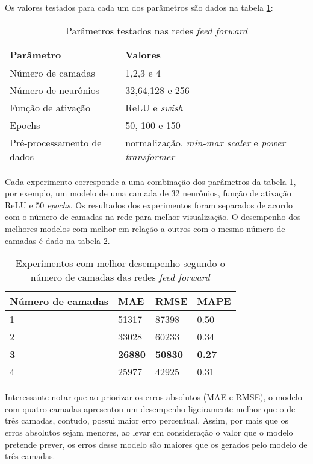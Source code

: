 Os valores testados para cada um dos parâmetros são dados na tabela \ref{tab:param-mlp}:

\begin{table}[H]
    \centering
    \begin{tabular}{ll}
        \toprule
        Parâmetro           & Valores   \\
        \midrule
        Número de camadas   & 1,2,3 e 4 \\
        Número de neurônios & 32,64,128 e 256       \\
        Função de ativação  & ReLU e \textit{swish}  \\
        Epochs              & 50, 100 e 150      \\
        Pré-processamento de dados & normalização, \textit{min-max scaler} e \textit{power transformer}\\
        \bottomrule
    \end{tabular}
    \caption{Parâmetros testados nas redes \textit{feed forward}}
    \label{tab:param-mlp}
\end{table} 

Cada experimento corresponde a uma combinação dos parâmetros 
da tabela \ref{tab:param-mlp}, por exemplo, um modelo de uma 
camada de 32 neurônios, função de ativação ReLU e 50 \textit{epochs}.
Os resultados dos experimentos foram separados de acordo 
com o número de camadas na rede para melhor visualização. O desempenho dos 
melhores modelos com melhor em relação a outros com o mesmo número de 
camadas é dado na tabela \ref{tab:res-mlp}.

\begin{table}[H]
    \centering
    \caption{Experimentos com melhor desempenho segundo o número de camadas das redes \textit{feed forward}}
    \begin{tabular}{llll}
    \toprule
    Número de camadas  & MAE & RMSE & MAPE \\
    \midrule
    1 & 51317  & 87398  & 0.50\\
    2 & 33028  & 60233 & 0.34 \\
    \textbf{3} & \textbf{26880}  & \textbf{50830} & \textbf{0.27} \\
    4 & 25977  & 42925 & 0.31 \\
    \bottomrule
    \end{tabular}
    \label{tab:res-mlp}
\end{table}

Interessante notar que ao priorizar os erros absolutos (MAE e RMSE), o modelo 
com quatro camadas apresentou um desempenho ligeiramente
melhor que o de três camadas, contudo, possui maior erro percentual.
Assim, por mais que os erros absolutos sejam menores, ao levar em 
consideração o valor que o modelo pretende prever, os erros desse 
modelo são maiores que os gerados pelo modelo de três camadas. 


